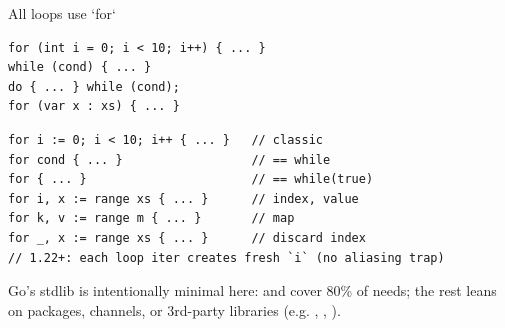 \documentclass[10pt]{article}
\begin{document}
\begin{construct}{All loops use `for`}
\noindent
\begin{minipage}[t]{0.485\linewidth}
\begin{lstlisting}[style=java, title=Java]
for (int i = 0; i < 10; i++) { ... }
while (cond) { ... }
do { ... } while (cond);
for (var x : xs) { ... }
\end{lstlisting}
\end{minipage}\hfill
\begin{minipage}[t]{0.485\linewidth}
\begin{lstlisting}[style=go, title=Go]
for i := 0; i < 10; i++ { ... }   // classic
for cond { ... }                  // == while
for { ... }                       // == while(true)
for i, x := range xs { ... }      // index, value
for k, v := range m { ... }       // map
for _, x := range xs { ... }      // discard index
// 1.22+: each loop iter creates fresh `i` (no aliasing trap)
\end{lstlisting}
\end{minipage}
\end{construct}


Go's stdlib is intentionally minimal here:  and  cover
80\% of needs; the rest leans on  packages, channels, or
3rd-party libraries (e.g. , ,
).

\end{document}
